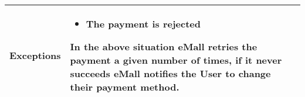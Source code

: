 \documentclass[11pt]{article}
\begin{document}
\begin{description}
\begin{table}[H]
\begin{tabularx}{\textwidth}{|>{\hsize=0.5\hsize}X|>{\hsize=1.5\hsize}X|}
            \hline
            \textbf{Exceptions} & 
                \begin{minipage}[t]{\hsize}
                \vspace{0pt}
                \begin{itemize}[topsep=0pt, leftmargin=*]
                    \item The payment is rejected
                \end{itemize}
                \vspace{8pt}
                \end{minipage}
                In the above situation eMall retries the payment a given number of times, if it never succeeds eMall notifies the User to change their payment method.
                \vspace{6pt}
            \\
            \hline
        \end{tabularx}
    \end{table}
    

\end{description}
\end{document}

